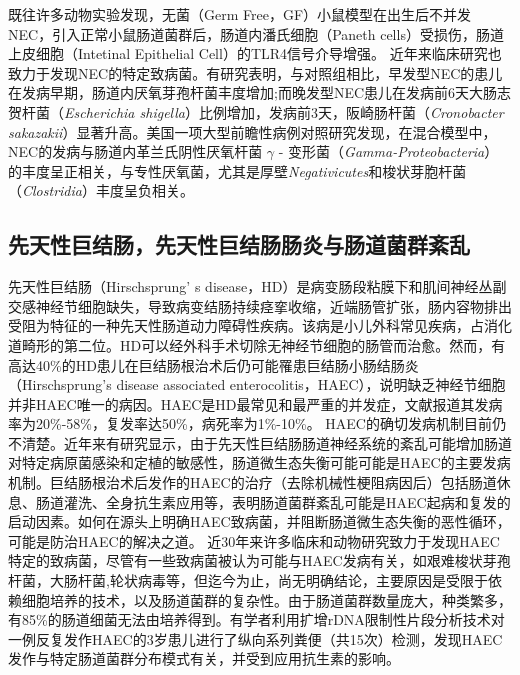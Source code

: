 既往许多动物实验发现，无菌（Germ Free，GF）小鼠模型在出生后不并发NEC\cite{rozenfeld2001role}，引入正常小鼠肠道菌群后，肠道内潘氏细胞（Paneth cells）受损伤，肠道上皮细胞（Intetinal Epithelial Cell）的TLR4信号介导增强\cite{white2017paneth}。
近年来临床研究也致力于发现NEC的特定致病菌。有研究表明，与对照组相比，早发型NEC的患儿在发病早期，肠道内厌氧芽孢杆菌丰度增加;而晚发型NEC患儿在发病前6天大肠志贺杆菌（\textit{Escherichia shigella}）比例增加，发病前3天，阪崎肠杆菌（\textit{Cronobacter sakazakii}）显著升高\cite{zhou2015longitudinal}。美国一项大型前瞻性病例对照研究发现，在混合模型中，NEC的发病与肠道内革兰氏阴性厌氧杆菌 $\gamma$ - 变形菌（\textit{Gamma-Proteobacteria}）的丰度呈正相关，与专性厌氧菌，尤其是厚壁\textit{Negativicutes}和梭状芽胞杆菌（\textit{Clostridia}）丰度呈负相关\cite{la2014patterned}。

\subsection{先天性巨结肠，先天性巨结肠肠炎与肠道菌群紊乱}
先天性巨结肠（Hirschsprung’ s disease，HD）是病变肠段粘膜下和肌间神经丛副交感神经节细胞缺失，导致病变结肠持续痉挛收缩，近端肠管扩张，肠内容物排出受阻为特征的一种先天性肠道动力障碍性疾病。该病是小儿外科常见疾病，占消化道畸形的第二位\cite{langer1999transanal}。HD可以经外科手术切除无神经节细胞的肠管而治愈。然而，有高达40\%的HD患儿在巨结肠根治术后仍可能罹患巨结肠小肠结肠炎（Hirschsprung’s disease associated enterocolitis，HAEC），说明缺乏神经节细胞并非HAEC唯一的病因。HAEC是HD最常见和最严重的并发症，文献报道其发病率为20\%-58\%，复发率达50\%，病死率为1\%-10\%\cite{frykman2012hirschsprung}。
HAEC的确切发病机制目前仍不清楚\cite{austin2012pathogenesis}。近年来有研究显示，由于先天性巨结肠肠道神经系统的紊乱可能增加肠道对特定病原菌感染和定植的敏感性，肠道微生态失衡可能可能是HAEC的主要发病机制\cite{frykman2012hirschsprung}。巨结肠根治术后发作的HAEC的治疗（去除机械性梗阻病因后）包括肠道休息、肠道灌洗、全身抗生素应用等，表明肠道菌群紊乱可能是HAEC起病和复发的启动因素。如何在源头上明确HAEC致病菌，并阻断肠道微生态失衡的恶性循环，可能是防治HAEC的解决之道。
近30年来许多临床和动物研究致力于发现HAEC特定的致病菌，尽管有一些致病菌被认为可能与HAEC发病有关，如艰难梭状芽孢杆菌\cite{thomas1982association}，大肠杆菌\cite{thomas1986enterocolitis},轮状病毒\cite{wilson1990microbiological}等，但迄今为止，尚无明确结论，主要原因是受限于依赖细胞培养的技术，以及肠道菌群的复杂性。由于肠道菌群数量庞大，种类繁多，有85\%的肠道细菌无法由培养得到。有学者利用扩增rDNA限制性片段分析技术对一例反复发作HAEC的3岁患儿进行了纵向系列粪便（共15次）检测，发现HAEC发作与特定肠道菌群分布模式有关，并受到应用抗生素的影响\cite{de2010genomics}。
